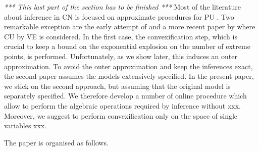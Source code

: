 \emph{*** This last part of the section has to be finished ***} Most of the literature about inference in CN is focused on approximate procedures for PU \cite{xxx}. Two remarkable exception are the early attempt of \cite{rocha} and a more recent paper by \cite{maua} where CU by VE is considered. In the first case, the convexification step, which is crucial to keep a bound on the exponential explosion on the number of extreme points, is performed. Unfortunately, as we show later, this induces an outer approximation. To avoid the outer approximation and keep the inferences exact, the second paper assumes the models extensively specified. In the present paper, we stick on the second approach, but assuming that the original model is separately specified. We therefore develop a number of online procedure which allow to perform the algebraic operations required by inference without xxx. Moreover, we suggest to perform convexification only on the space of single variables xxx.

The paper is organised as follows.
